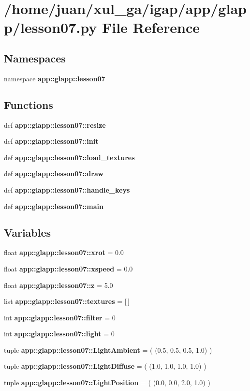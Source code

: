 \section{/home/juan/xul\_\-ga/igap/app/glapp/lesson07.py File Reference}
\label{lesson07_8py}
\subsection*{Namespaces}
\begin{CompactItemize}
\item 
namespace {\bf app::glapp::lesson07}
\end{CompactItemize}
\subsection*{Functions}
\begin{CompactItemize}
\item 
def {\bf app::glapp::lesson07::resize}
\item 
def {\bf app::glapp::lesson07::init}
\item 
def {\bf app::glapp::lesson07::load\_\-textures}
\item 
def {\bf app::glapp::lesson07::draw}
\item 
def {\bf app::glapp::lesson07::handle\_\-keys}
\item 
def {\bf app::glapp::lesson07::main}
\end{CompactItemize}
\subsection*{Variables}
\begin{CompactItemize}
\item 
float {\bf app::glapp::lesson07::xrot} = 0.0
\item 
float {\bf app::glapp::lesson07::xspeed} = 0.0
\item 
float {\bf app::glapp::lesson07::z} = 5.0
\item 
list {\bf app::glapp::lesson07::textures} = [$\,$]
\item 
int {\bf app::glapp::lesson07::filter} = 0
\item 
int {\bf app::glapp::lesson07::light} = 0
\item 
tuple {\bf app::glapp::lesson07::LightAmbient} = ( (0.5, 0.5, 0.5, 1.0) )
\item 
tuple {\bf app::glapp::lesson07::LightDiffuse} = ( (1.0, 1.0, 1.0, 1.0) )
\item 
tuple {\bf app::glapp::lesson07::LightPosition} = ( (0.0, 0.0, 2.0, 1.0) )
\end{CompactItemize}
